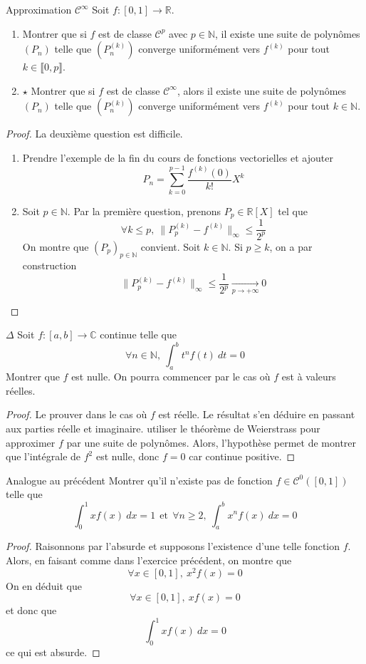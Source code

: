 \documentclass[french,a4paper]{article}
\newcommand{\N}{\mathbb{N}}
\newcommand{\R}{\mathbb{R}}
\newcommand{\C}{\mathbb{C}}
\theoremstyle{plain}
\theoremstyle{definition}
\theoremstyle{remark}
\begin{document}
\begin{ex}{Approximation $\mathcal{C}^\infty$}
	Soit $f:[0,1]\to\R$.
	\begin{enumerate}
		\item Montrer que si $f$ est de classe $\mathcal{C}^p$ avec $p\in\N$, il existe une suite de polynômes $(P_n)$ telle que $(P_n^{(k)})$ converge uniformément vers $f^{(k)}$ pour tout $k\in\llbracket0,p\rrbracket$.
		\item $\star$ Montrer que si $f$ est de classe $\mathcal{C}^\infty$, alors il existe une suite de polynômes $(P_n)$ telle que $(P_n^{(k)})$ converge uniformément vers $f^{(k)}$ pour tout $k\in\N$.
	\end{enumerate}
\end{ex}
\begin{proof}
	La deuxième question est difficile.
	\begin{enumerate}
		\item Prendre l'exemple de la fin du cours de fonctions vectorielles et ajouter $$P_n=\sum_{k=0}^{p-1}\frac{f^{(k)}(0)}{k!}X^k$$
		\item Soit $p\in\N$. Par la première question, prenons $P_p\in\R[X]$ tel que $$\forall k\leqslant p,\ \lVert P_p^{(k)}-f^{(k)}\rVert_\infty\leqslant\frac{1}{2^p}$$ On montre que $(P_p)_{p\in\N}$ convient. Soit $k\in\N$. Si $p\geqslant k$, on a par construction $$\lVert P_p^{(k)}-f^{(k)}\rVert_\infty\leqslant\frac{1}{2^p}\xrightarrow[p\to+\infty]{}0$$
	\end{enumerate}
\end{proof}

\begin{ex}{$\Delta$}
	Soit $f:[a,b]\to\C$ continue telle que $$\forall n\in\N,\ \int_{a}^{b}t^nf(t)\ dt=0$$ Montrer que $f$ est nulle. On pourra commencer par le cas où $f$ est à valeurs réelles.
\end{ex}
\begin{proof}
	Le prouver dans le cas où $f$ est réelle. Le résultat s'en déduire en passant aux parties réelle et imaginaire. utiliser le théorème de Weierstrass pour approximer $f$ par une suite de polynômes. Alors, l'hypothèse permet de montrer que l'intégrale de $f^2$ est nulle, donc $f=0$ car continue positive.
\end{proof}

\begin{ex}{Analogue au précédent}
	Montrer qu'il n'existe pas de fonction $f\in\mathcal{C}^0([0,1])$ telle que $$\int_{0}^{1}xf(x)\ dx=1 \ \ \text{et}\ \ \forall n\geqslant 2,\ \int_{a}^{b}x^nf(x)\ dx=0$$
\end{ex}
\begin{proof}
	Raisonnons par l'absurde et supposons l'existence d'une telle fonction $f$. Alors, en faisant comme dans l'exercice précédent, on montre que $$\forall x\in[0,1],\ x^2f(x)=0$$ On en déduit que $$\forall x\in[0,1],\ xf(x)=0$$ et donc que $$\int_{0}^{1}xf(x)\ dx=0$$ ce qui est absurde.
\end{proof}
\end{document}
